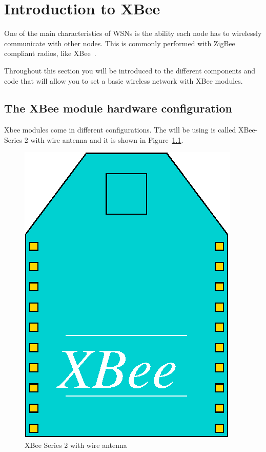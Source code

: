 \chapter{Introduction to XBee}

One of the main characteristics of WSNs is the ability each node has to wirelessly communicate with other nodes. 
This is commonly performed with ZigBee compliant radios, like XBee~\cite{faludi2010bws}.

Throughout this section you will be introduced to the different components and code that will allow you to set a basic wireless network with XBee modules.

\section{The XBee module hardware configuration}\label{xbee:hardware}

Xbee modules come in different configurations. The will be using is called XBee-Series 2 with wire antenna and it is shown in Figure~\ref{fig:xbee}.

\begin{figure}[htbp]
  \centering
  \includegraphics[width=0.7\linewidth]{figures/xbee.eps}
  \caption{XBee Series 2 with wire antenna
  \label{fig:xbee}}
\end{figure}